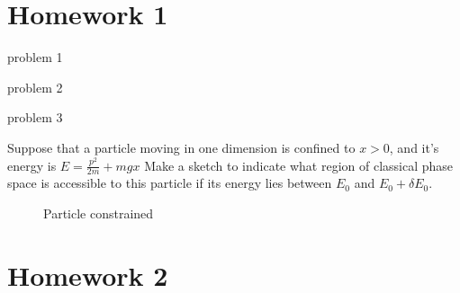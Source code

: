 \documentclass{article}
\date{Winter 2022}
\author{\EC}
\begin{document}
\maketitle
\section{Homework 1}
\begin{problem}
    problem 1
\end{problem}
\begin{problem}
    problem 2
\end{problem}
\begin{problem}
    problem 3
\end{problem}
\begin{problem}
    Suppose that a particle moving in one dimension is confined to $x>0$, and it's energy is $E=\frac{p^2}{2m}+mgx$ Make a sketch to indicate what
    region of classical phase space is accessible to this particle if its energy lies between $E_0$ and $E_0+\delta E_0$.
    \begin{figure}[H]
        \centering
        \caption{Particle constrained}
    \end{figure}
\end{problem}

\newpage
\section{Homework 2}
\setcounter{probcount}{0}
\end{document}
